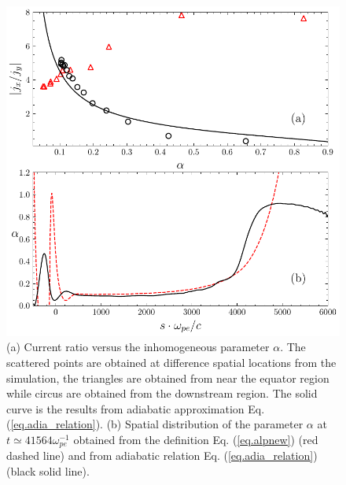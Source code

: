 \begin{figure}
    \centering
    \includegraphics[scale=0.5]{img/alpha.pdf}
    \caption{(a) Current ratio versus the inhomogeneous parameter $\alpha$. The scattered points are obtained at difference spatial locations from the simulation, the triangles are obtained from near the equator region while circus are obtained from the downstream region. 
    The solid curve is the results from adiabatic approximation Eq. (\ref{eq.adia_relation}). 
    (b) Spatial distribution   of the parameter $\alpha$ at $t\simeq41564\omega_{pe}^{-1}$ obtained  from the definition  Eq. (\ref{eq.alpnew}) (red dashed line) and  from adiabatic relation Eq. (\ref{eq.adia_relation}) (black solid line).
    }
    \label{fig.adiabatic}
\end{figure}


